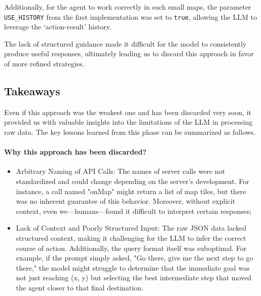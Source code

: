 Additionally, for the agent to work correctly in such small maps, the parameter
\texttt{USE\_HISTORY} from the first implementation was set to \texttt{true}, allowing
the LLM to leverage the `action-result' history.

The lack of structured guidance made it difficult for the model to consistently produce
useful responses, ultimately leading us to discard this approach in favor of
more refined strategies.

\subsection{Takeaways}

Even if this approach was the weakest one and has been discarded very soon, it
provided us with valuable insights into the limitations of the LLM in processing
raw data. The key lessons learned from this phase can be summarized as follows.

\paragraph{Why this approach has been discarded?}
\begin{itemize}
  \item Arbitrary Naming of API Calls: The names of server calls were not
    standardized and could change depending on the server's development. For instance,
    a call named "onMap" might return a list of map tiles, but there was no inherent
    guarantee of this behavior. Moreover, without explicit context, even
    we—humans—found it difficult to interpret certain responses;

  \item Lack of Context and Poorly Structured Input: The raw JSON data lacked
    structured context, making it challenging for the LLM to infer the correct course
    of action. Additionally, the query format itself was suboptimal. For example,
    if the prompt simply asked, "Go there, give me the next step to go there,"
    the model might struggle to determine that the immediate goal was not just
    reaching (x, y) but selecting the best intermediate step that moved the agent
    closer to that final destination.
\end{itemize}


